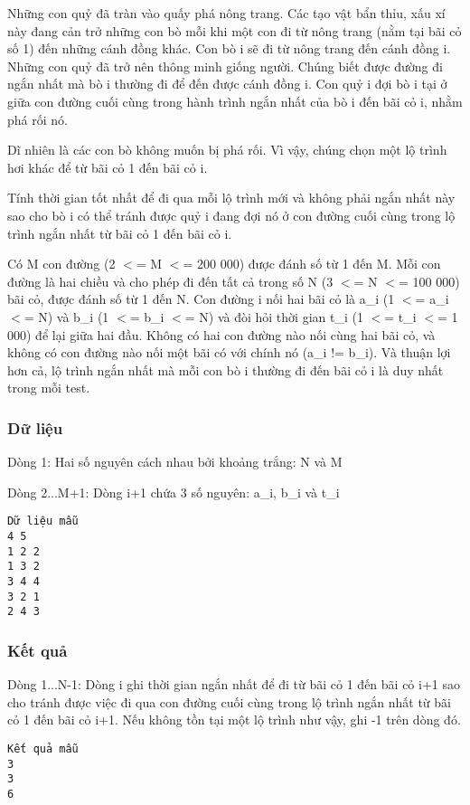 



   Những con quỷ đã tràn vào quấy phá nông trang. Các tạo vật bẩn thỉu, xấu xí này đang cản trở những con bò mỗi khi một con đi từ nông trang (nằm tại bãi cỏ số 1) đến những cánh đồng khác. Con bò i sẽ đi từ nông trang đến cánh đồng i. Những con quỷ đã trở nên thông minh giống người. Chúng biết được đường đi ngắn nhất mà bò i thường đi để đến được cánh đồng i. Con quỷ i đợi bò i tại ở giữa con đường cuối cùng trong hành trình ngắn nhất của bò i đến bãi cỏ i, nhằm phá rối nó.  

   Dĩ nhiên là các con bò không muốn bị phá rối. Vì vậy, chúng chọn một lộ trình hơi khác để từ bãi cỏ 1 đến bãi cỏ i.  

   Tính thời gian tốt nhất để đi qua mỗi lộ trình mới và không phải ngắn nhất này sao cho bò i có thể tránh được quỷ i đang đợi nó ở con đường cuối cùng trong lộ trình ngắn nhất từ bãi cỏ 1 đến bãi cỏ i.  

   Có M con đường (2 $<$= M $<$= 200 000) được đánh số từ 1 đến M. Mỗi con đường là hai chiều và cho phép đi đến tất cả trong số N (3 $<$= N $<$= 100 000) bãi cỏ, được đánh số từ 1 đến N. Con đường i nối hai bãi cỏ là a\_i (1 $<$= a\_i $<$= N) và b\_i (1 $<$= b\_i $<$= N) và đòi hỏi thời gian t\_i (1 $<$= t\_i $<$= 1 000) để lại giữa hai đầu. Không có hai con đường nào nối cùng hai bãi cỏ, và không có con đường nào nối một bãi có với chính nó (a\_i != b\_i). Và thuận lợi hơn cả, lộ trình ngắn nhất mà mỗi con bò i thường đi đến bãi cỏ i là duy nhất trong mỗi test.  

\subsubsection{   Dữ liệu  }

   Dòng 1: Hai số nguyên cách nhau bởi khoảng trắng: N và M  

   Dòng 2...M+1: Dòng i+1 chứa 3 số nguyên: a\_i, b\_i và t\_i  
\begin{verbatim}
Dữ liệu mẫu
4 5
1 2 2
1 3 2
3 4 4
3 2 1
2 4 3
\end{verbatim}

\subsubsection{   Kết quả  }

   Dòng 1...N-1: Dòng i ghi thời gian ngắn nhất để đi từ bãi cỏ 1 đến bãi cỏ i+1 sao cho tránh được việc đi qua con đường cuối cùng trong lộ trình ngắn nhất từ bãi cỏ 1 đến bãi cỏ i+1. Nếu không tồn tại một lộ trình như vậy, ghi -1 trên dòng đó.  
\begin{verbatim}
Kết quả mẫu
3
3
6
\end{verbatim}